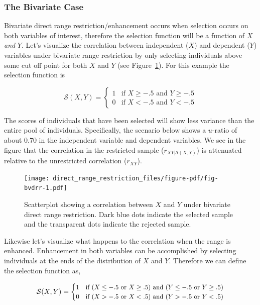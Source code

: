\documentclass[
  letterpaper,
  DIV=11,
  numbers=noendperiod]{scrreprt}
\begin{document}
\hypertarget{the-bivariate-case-1}{%
\subsubsection*{The Bivariate Case}\label{the-bivariate-case-1}}

Bivariate direct range restriction/enhancement occurs when selection
occurs on both variables of interest, therefore the selection function
will be a function of \(X\) \emph{and} \(Y\). Let's visualize the
correlation between independent (\(X\)) and dependent (\(Y\)) variables
under bivariate range restriction by only selecting individuals above
some cut off point for both \(X\) and \(Y\) (see
Figure~\ref{fig-bvdrr}). For this example the selection function is

\[
\mathcal{S}(X,Y) = \begin{cases}1 & \text{if } X\geq -.5 \text{ and }Y\geq-.5\\ 0 & \text{if }X<-.5  \text{ and }Y<-.5 \end{cases}
\]

The scores of individuals that have been selected will show less
variance than the entire pool of individuals. Specifically, the scenario
below shows a \(u\)-ratio of about 0.70 in the independent variable and
dependent variables. We see in the figure that the correlation in the
restricted sample (\(r_{XY|\mathcal{S}(X,Y)}\)) is attenuated relative
to the unrestricted correlation (\(r_{XY}\)).

\begin{figure}[H]

{\centering \texttt{[image: direct\_range\_restriction\_files/figure-pdf/fig-bvdrr-1.pdf]}

}

\caption{\label{fig-bvdrr}Scatterplot showing a correlation between
\(X\) and \(Y\) under bivariate direct range restriction. Dark blue dots
indicate the selected sample and the transparent dots indicate the
rejected sample.}

\end{figure}

Likewise let's visualize what happens to the correlation when the range
is enhanced. Enhancement in both variables can be accomplished by
selecting individuals at the ends of the distribution of \(X\) and
\(Y\). Therefore we can define the selection function as,

\[
\small{\mathcal{S}(X,Y) = \begin{cases}1 & \text{if } (X\leq -.5 \text{ or } X\geq .5) \text{ and } (Y\leq -.5 \text{ or } Y\geq .5) \\ 0 & \text{if }(X>-.5 \text{ or }X<.5)  \text{ and }(Y>-.5 \text{ or }Y<.5) \end{cases}}
\]
\end{document}
